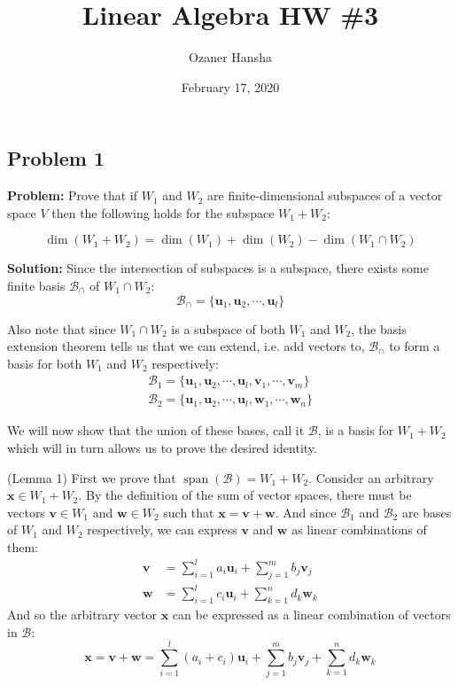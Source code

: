 \documentclass{article}
\renewcommand\vec{\mathbf}
\begin{document}
\title{Linear Algebra HW \#3}
\author{Ozaner Hansha}
\date{February 17, 2020}
\maketitle

\subsection*{Problem 1}
\noindent\textbf{Problem:} Prove that if $W_1$ and $W_2$ are finite-dimensional subspaces of a vector space $V$ then the following holds for the subspace $W_1+W_2$:

$$\operatorname{dim}(W_1+W_2) = \operatorname{dim}(W_1)+\operatorname{dim}(W_2)-\operatorname{dim}(W_1\cap W_2)$$

\noindent\textbf{Solution:} Since the intersection of subspaces is a subspace, there exists some finite basis $\mathcal B_\cap$ of $W_1\cap W_2$:
$$\mathcal B_\cap =\{\vec u_1,\vec u_2,\cdots,\vec u_l\}$$

Also note that since $W_1\cap W_2$ is a subspace of both $W_1$ and $W_2$, the basis extension theorem tells us that we can extend, i.e. add vectors to, $\mathcal B_\cap$ to form a basis for both $W_1$ and $W_2$ respectively:
\begin{gather*}
  \mathcal B_1 =\{\vec u_1,\vec u_2,\cdots,\vec u_l,\vec v_1,\cdots,\vec v_m\}\\
  \mathcal B_2 =\{\vec u_1,\vec u_2,\cdots,\vec u_l,\vec w_1,\cdots,\vec w_n\}
\end{gather*}

We will now show that the union of these bases, call it $\mathcal B$, is a basis for $W_1+W_2$ which will in turn allows us to prove the desired identity.

(Lemma 1) First we prove that $\operatorname{span}(\mathcal B)=W_1+W_2$. Consider an arbitrary $\vec x\in W_1+W_2$. By the definition of the sum of vector spaces, there must be vectors $\vec v\in W_1$ and $\vec w\in W_2$ such that $\vec x=\vec v+\vec w$. And since $\mathcal B_1$ and $\mathcal B_2$ are bases of $W_1$ and $W_2$ respectively, we can express $\vec v$ and $\vec w$ as linear combinations of them:
\begin{align*}
  \vec v&=\sum^l_{i=1}a_i\vec u_i+\sum^m_{j=1}b_j\vec v_j\\
  \vec w&=\sum^l_{i=1}c_i\vec u_i+\sum^n_{k=1}d_k\vec w_k
\end{align*}
And so the arbitrary vector $\vec x$ can be expressed as a linear combination of vectors in $\mathcal B$:
$$\vec x=\vec v+\vec w=\sum^l_{i=1}(a_i+c_i)\vec u_i+\sum^m_{j=1}b_j\vec v_j+\sum^n_{k=1}d_k\vec w_k$$
\end{document}
